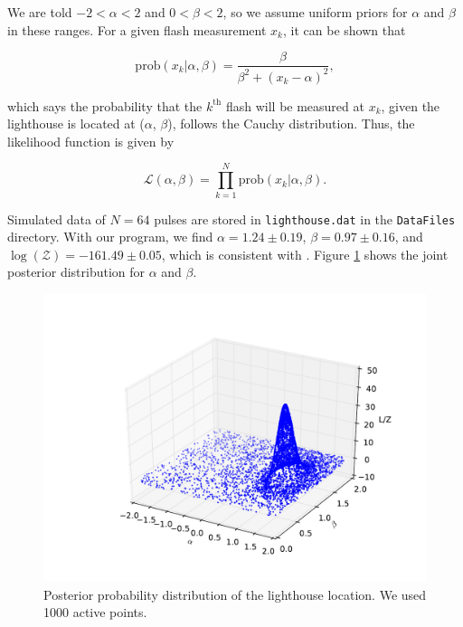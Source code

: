 \documentclass{article}
\def\mrm{\mathrm}
\begin{document}
 \vspace{0.2cm}
 
\noindent We are told $-2 < \alpha < 2$ and $0 < \beta < 2$, so we assume uniform priors for $\alpha$ and $\beta$ in these ranges. For a given flash measurement $x_k$, it can be shown that 

\begin{equation*}
\mrm{prob}(x_k | \alpha, \beta) = \frac{\beta}{\beta^2 + (x_k - \alpha)^2},
\end{equation*}

\noindent which says the probability that the $k^\mrm{th}$ flash will be measured at $x_k$, given the lighthouse is located at ($\alpha$, $\beta$), follows the Cauchy distribution. Thus, the likelihood function is given by

\begin{equation*}
\mathcal{L}(\alpha, \beta) = \prod_{k=1}^N \mrm{prob}(x_k | \alpha, \beta).
\end{equation*}

\noindent Simulated data of $N=64$ pulses are stored in {\tt lighthouse.dat} in the {\tt DataFiles} directory. With our program, we find $\alpha = 1.24 \pm 0.19$, $\beta = 0.97 \pm 0.16$, and $\log(\mathcal{Z}) =  -161.49 \pm 0.05$, which is consistent with \cite{Siv2006}. Figure \ref{fig:lighthouse} shows the joint posterior distribution for $\alpha$ and $\beta$. 

\begin{figure}[h]
\begin{center}
\includegraphics[width=12.0cm,trim=0cm 0cm 0cm 0cm,clip=true]{lighthouse.pdf}
\caption{Posterior probability distribution of the lighthouse location. We used 1000 active points.}
\label{fig:lighthouse}
\end{center}
\end{figure}
\end{document}
